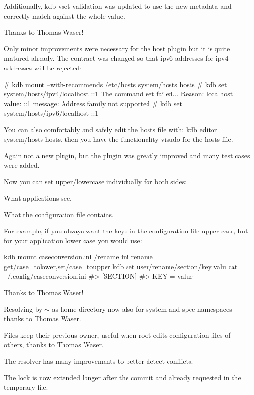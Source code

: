 Additionally, {\ttfamily kdb vset} validation was updated to use the new metadata and correctly match against the whole value.

Thanks to Thomas Waser!

Only minor improvements were necessary for the host plugin but it is quite matured already. The contract was changed so that ipv6 addresses for ipv4 addresses will be rejected\+:


\begin{DoxyCode}
# kdb mount --with-recommends /etc/hosts system/hosts hosts
# kdb set system/hosts/ipv4/localhost ::1
The command set failed...
Reason: localhost value: ::1 message: Address family not supported
# kdb set system/hosts/ipv6/localhost ::1
\end{DoxyCode}


You can also comfortably and safely edit the hosts file with\+: {\ttfamily kdb editor system/hosts hosts}, then you have the functionality {\ttfamily visudo} for the hosts file.

Again not a new plugin, but the plugin was greatly improved and many test cases were added.

Now you can set upper/lowercase individually for both sides\+:


\begin{DoxyEnumerate}
\item What applications see.
\item What the configuration file contains.
\end{DoxyEnumerate}

For example, if you always want the keys in the configuration file upper case, but for your application lower case you would use\+:


\begin{DoxyCode}
kdb mount caseconversion.ini /rename ini rename get/case=tolower,set/case=toupper
kdb set user/rename/section/key valu
cat ~/.config/caseconversion.ini
#> [SECTION]
#> KEY = value
\end{DoxyCode}


Thanks to Thomas Waser!

Resolving by $\sim$ as home directory now also for system and spec namespaces, thanks to Thomas Waser.

Files keep their previous owner, useful when root edits configuration files of others, thanks to Thomas Waser.

The resolver has many improvements to better detect conflicts.

The lock is now extended longer after the commit and already requested in the temporary file.

